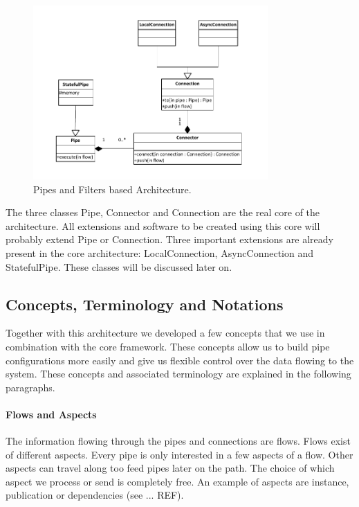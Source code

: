 \begin{figure}[htp]
	\centering
		\includegraphics[width=0.8\textwidth]{fig/architecturev2}
	\caption{Pipes and Filters based Architecture.}
	\label{fig:architecturev2}
\end{figure}

The three classes Pipe, Connector and Connection are the real core of the architecture. All extensions and software to be created using this core will probably extend Pipe or Connection. Three important extensions are already present in the core architecture: LocalConnection, AsyncConnection and StatefulPipe. These classes will be discussed later on.

\subsection{Concepts, Terminology and Notations}

Together with this architecture we developed a few concepts that we use in combination with the core framework. These concepts allow us to build pipe configurations more easily and give us flexible control over the data flowing to the system. These concepts and associated terminology are explained in the following paragraphs.

\paragraph{Flows and Aspects} The information flowing through the pipes and connections are flows. Flows exist of different aspects. Every pipe is only interested in a few aspects of a flow. Other aspects can travel along too feed pipes later on the path. The choice of which aspect we process or send is completely free. An example of aspects are instance, publication or dependencies (see ... REF).


